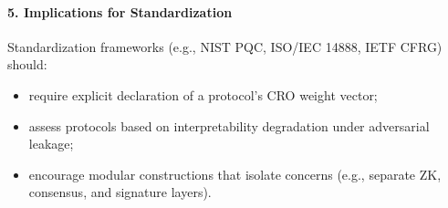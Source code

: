 \documentclass[preprint,12pt]{elsarticle}
\begin{document}
            \paragraph{5. Implications for Standardization}
                Standardization frameworks (e.g., NIST PQC, ISO/IEC 14888, IETF CFRG) should:
                \begin{itemize}
                    \item require explicit declaration of a protocol's CRO weight vector;
                    \item assess protocols based on interpretability degradation under adversarial leakage;
                    \item encourage modular constructions that isolate concerns (e.g., separate ZK, consensus, and signature layers).
                \end{itemize}
\end{document}
